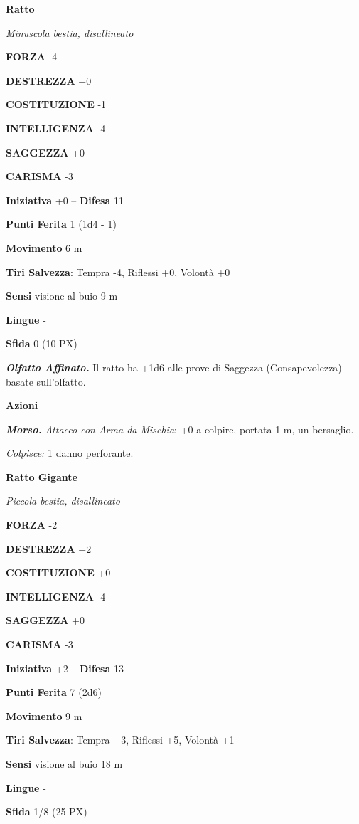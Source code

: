 \begin{multicols}{2}
	\medskip\textbf{Ratto}

	\textit{Minuscola bestia, disallineato}

	\textbf{FORZA} -4

	\textbf{DESTREZZA} +0

	\textbf{COSTITUZIONE} -1

	\textbf{INTELLIGENZA} -4

	\textbf{SAGGEZZA} +0

	\textbf{CARISMA} -3

	\textbf{Iniziativa} +0 -- \textbf{Difesa} 11

	\textbf{Punti Ferita} 1 (1d4 - 1)

	\textbf{Movimento} 6 m

	\textbf{Tiri Salvezza}: Tempra -4, Riflessi +0, Volontà +0

	\textbf{Sensi} visione al buio 9 m

	\textbf{Lingue} -

	\textbf{Sfida} 0 (10 PX)

	\textit{\textbf{Olfatto Affinato.}} Il ratto ha +1d6 alle prove di Saggezza (Consapevolezza) basate sull'olfatto.

	\textbf{Azioni}

	\textit{\textbf{Morso.} Attacco con Arma da Mischia}: +0 a colpire, portata 1 m, un bersaglio.

	\textit{Colpisce:} 1 danno perforante.

	\medskip\textbf{Ratto Gigante}

	\textit{Piccola bestia, disallineato}

	\textbf{FORZA} -2

	\textbf{DESTREZZA} +2

	\textbf{COSTITUZIONE} +0

	\textbf{INTELLIGENZA} -4

	\textbf{SAGGEZZA} +0

	\textbf{CARISMA} -3

	\textbf{Iniziativa} +2 -- \textbf{Difesa} 13

	\textbf{Punti Ferita} 7 (2d6)

	\textbf{Movimento} 9 m

	\textbf{Tiri Salvezza}: Tempra +3, Riflessi +5, Volontà +1

	\textbf{Sensi} visione al buio 18 m

	\textbf{Lingue} -

	\textbf{Sfida} 1/8 (25 PX)


\end{multicols}
